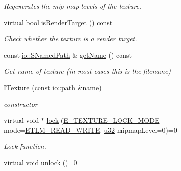 \begin{DoxyCompactItemize}
\begin{DoxyCompactList}\small\item\em Regenerates the mip map levels of the texture. \end{DoxyCompactList}\item 
virtual bool \hyperlink{classirr_1_1video_1_1ITexture_aac5c0e281e1aa49365fdb7e7fa4d7342}{is\+Render\+Target} () const
\begin{DoxyCompactList}\small\item\em Check whether the texture is a render target. \end{DoxyCompactList}\item 
\mbox{\label{classirr_1_1video_1_1ITexture_ace31573b2a624446f15fe56d1e609810}} 
const \hyperlink{structirr_1_1io_1_1SNamedPath}{io\+::\+S\+Named\+Path} \& \hyperlink{classirr_1_1video_1_1ITexture_ace31573b2a624446f15fe56d1e609810}{get\+Name} () const
\begin{DoxyCompactList}\small\item\em Get name of texture (in most cases this is the filename) \end{DoxyCompactList}\item 
\mbox{\label{classirr_1_1video_1_1ITexture_a32dbd62fef8a65f11e5b440706346c90}} 
\hyperlink{classirr_1_1video_1_1ITexture_a32dbd62fef8a65f11e5b440706346c90}{I\+Texture} (const \hyperlink{namespaceirr_1_1io_a6468281622ce3a1c46b72e19f32dded5}{io\+::path} \&name)
\begin{DoxyCompactList}\small\item\em constructor \end{DoxyCompactList}\item 
virtual void $\ast$ \hyperlink{classirr_1_1video_1_1ITexture_aa09ee89973a645ebdd2bd61ed859df38}{lock} (\hyperlink{namespaceirr_1_1video_a3916d259e8fe0d0d02e8ee0adc8af5bc}{E\+\_\+\+T\+E\+X\+T\+U\+R\+E\+\_\+\+L\+O\+C\+K\+\_\+\+M\+O\+DE} mode=\hyperlink{namespaceirr_1_1video_a3916d259e8fe0d0d02e8ee0adc8af5bcad742bd0e885e6a08c86b8d3d5c601952}{E\+T\+L\+M\+\_\+\+R\+E\+A\+D\+\_\+\+W\+R\+I\+TE}, \hyperlink{namespaceirr_a0416a53257075833e7002efd0a18e804}{u32} mipmap\+Level=0)=0
\begin{DoxyCompactList}\small\item\em Lock function. \end{DoxyCompactList}\item 
virtual void \hyperlink{classirr_1_1video_1_1ITexture_a15b9a25aa18528ade37a492bd7b20a10}{unlock} ()=0

\end{DoxyCompactItemize}
